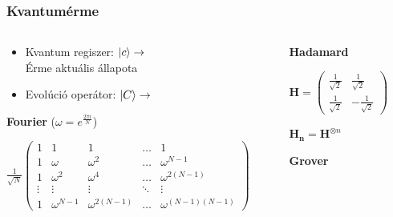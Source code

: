 \documentclass[aspectratio=169]{beamer}
\begin{document}
\begin{frame}
  \frametitle{Kvantumérme}
 
  \begin{columns}[t,onlytextwidth]
    \begin{column}{.5\textwidth}
     \begin{itemize}
    \item Kvantum regiszer: $\ket{c} \rightarrow$ \\ Érme aktuális állapota
    \item Evolúció operátor: $\ket{C} \rightarrow$
  \end{itemize}
      \begin{center}
    
    \textbf{Fourier} ($\omega = e^{\frac{2\pi{}i}{N}}$)

        \addvspace{10pt}

$\frac{1}{\sqrt{N}}
\begin{pmatrix}
  1 & 1 & 1 & \dots & 1 \\
  1 & \omega & \omega^2 & \dots & \omega^{N-1} \\
  1 & \omega^2 & \omega^4 & \dots & \omega^{2(N-1)} \\
  \vdots & \vdots & \vdots & \ddots & \vdots \\
  1 & \omega^{N-1} & \omega^{2(N-1)} & \dots & \omega^{(N-1)(N-1)}
\end{pmatrix}
$
    
    
    
      \end{center}

    \end{column}
    \begin{column}{.5\textwidth}
        \begin{center}
        
         \textbf{Hadamard}
        
        \addvspace{10pt}
        
$
   \mathbf{H} = \begin{pmatrix}
      \frac{1}{\sqrt{2}} & \frac{1}{\sqrt{2}}  \\
      \frac{1}{\sqrt{2}} & -\frac{1}{\sqrt{2}}
    \end{pmatrix}$

        \addvspace{10pt}
        
$\mathbf{H_n} = \mathbf{H}^{\otimes{}n}$


        \addvspace{10pt}
        
\textbf{Grover}
        

\end{center}
\end{column}
\end{columns}
\end{frame}
\end{document}

